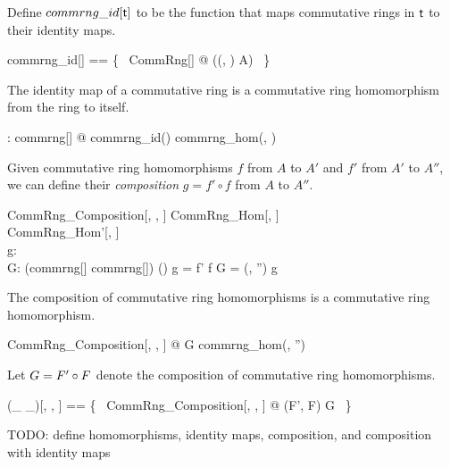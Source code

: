 \documentclass{amsart}
\begin{document}
Define $commrng\_id[\mathsf{t}]$ to be the function that maps commutative rings in $\mathsf{t}$ to their identity maps.

\begin{zed}
	commrng\_id[\genT] == \{~ CommRng[\genT] @ \strucA \mapsto ((\strucA, \strucA) \mapsto \id A) ~\}
\end{zed}

\begin{remark}
The identity map of a commutative ring is a commutative ring homomorphism from the ring to itself.

\begin{zed}
	\forall \strucA: commrng[\setT] @ commrng\_id(\strucA) \in commrng\_hom(\strucA, \strucA)
\end{zed}

\end{remark}

Given commutative ring homomorphisms $f$ from $A$ to $A'$ and $f'$ from $A'$ to $A''$,
we can define their \textit{composition} $g = f' \circ f$ from $A$ to $A''$.

\begin{schema}{CommRng\_Composition}[\genT, \genU, \genV]
	CommRng\_Hom[\genT, \genU] \\
	CommRng\_Hom'[\genU, \genV] \\
	g: \genT \pfun \genV \\
	G: (commrng[\genT] \cross commrng[\genV]) \cross (\genT \pfun \genV)
\where
	g = f' \circ f
\also
	G = (\strucA, \strucA'') \mapsto g
\end{schema}

\begin{remark}
The composition of commutative ring homomorphisms is a commutative ring homomorphism.

\begin{zed}
	\forall CommRng\_Composition[\setT, \setU, \setV] @ G \in commrng\_hom(\strucA, \strucA'')
\end{zed}

\end{remark}

Let $G = F' \mathbin{\circ} F$ denote the composition of commutative ring homomorphisms.

\begin{zed}
	(\_ \circCommrng \_)[\genT, \genU, \genV] == 
	\{~ CommRng\_Composition[\genT, \genU, \genV] @ (F', F) \mapsto G ~\}
\end{zed}


TODO: define homomorphisms, identity maps, composition, and composition with identity maps
\end{document}
